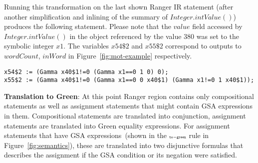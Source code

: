 %
Running this transformation on the last shown Ranger IR statement (after another simplification and inlining of the
summary of $Integer.intValue()$) produces the following statement.
%
Please note that the $value$ field accessed by $Integer.intValue()$ in the object referenced by the value
380 was set to the symbolic integer $x1$.
%
The variables $x54\$2$ and $x55\$2$ correspond to outputs to $wordCount$, $inWord$ in Figure~\ref{fig:mot-example} respectively.
\begin{lstlisting}
x54$2 := (Gamma x40$1!=0 (Gamma x1==0 1 0) 0);
x55$2 := (Gamma x40$1!=0 (Gamma x1==0 0 x40$1) (Gamma x1!=0 1 x40$1));
\end{lstlisting}
\textbf{Translation to Green}:
%
At this point Ranger region contains only compositional statements as well as assignment statements that might contain
GSA expressions in them.
%
Compositional statements are translated into conjunction, assignment statements are translated into Green equality expressions.
%
For assignment statements that have GSA expressions~(shown in the $\scriptscriptstyle\mathtt{to-green}$ rule in Figure~\ref{fig:semantics}),
these are translated into two disjunctive formulas that describes the assignment if the GSA condition or its negation
were satisfied.


